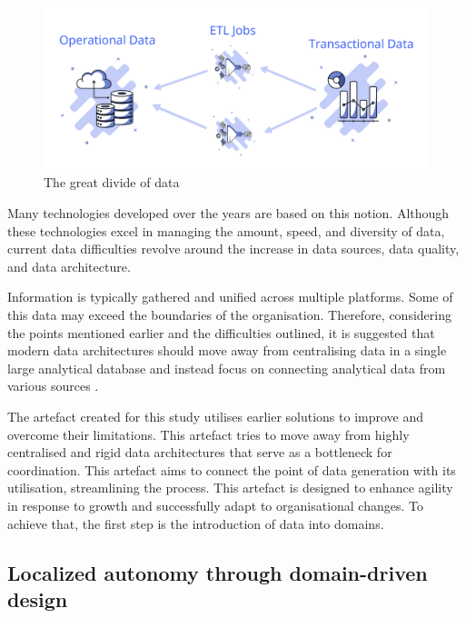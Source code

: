 \documentclass[review]{elsarticle}
\begin{document}
\begin{figure}[h]

  \centering

  \includegraphics[width=\linewidth]{images/data-planes.png}

  \caption{The great divide of data}

  \label{fig:dataPlanes}

\end{figure}

Many technologies developed over the years are based on this notion. Although these technologies excel in managing the amount, speed, and diversity of data, current data difficulties revolve around the increase in data sources, data quality, and data architecture. 

Information is typically gathered and unified across multiple platforms. Some of this data may exceed the boundaries of the organisation. Therefore, considering the points mentioned earlier and the difficulties outlined, it is suggested that modern data architectures should move away from centralising data in a single large analytical database and instead focus on connecting analytical data from various sources \cite{ataei2022state,DataMesh}. 

The artefact created for this study utilises earlier solutions to improve and overcome their limitations. This artefact tries to move away from highly centralised and rigid data architectures that serve as a bottleneck for coordination. This artefact aims to connect the point of data generation with its utilisation, streamlining the process. This artefact is designed to enhance agility in response to growth and successfully adapt to organisational changes. To achieve that, the first step is the introduction of data into domains. 

\subsection{Localized autonomy through domain-driven design}
\end{document}
